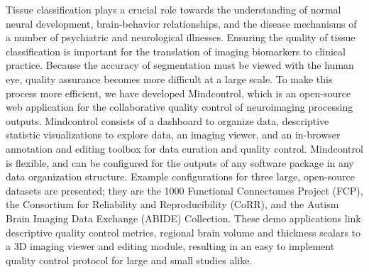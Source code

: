 Tissue classification plays a crucial role towards the understanding of normal neural development, brain-behavior relationships, and the disease mechanisms of a number of psychiatric and neurological illnesses. Ensuring the quality of tissue classification is important for the translation of imaging biomarkers to clinical practice. Because the accuracy of segmentation must be viewed with the human eye, quality assurance becomes more difficult at a large scale. To make this process more efficient, we have developed Mindcontrol, which is an open-source web application for the collaborative quality control of neuroimaging processing outputs. Mindcontrol consists of a dashboard to organize data, descriptive statistic visualizations to explore data, an imaging viewer, and an in-browser annotation and editing toolbox for data curation and quality control. Mindcontrol is flexible, and can be configured for the outputs of any software package in any data organization structure. Example configurations for three large, open-source datasets are presented; they are the 1000 Functional Connectomes Project (FCP), the Consortium for Reliability and Reproducibility (CoRR), and the Autism Brain Imaging Data Exchange (ABIDE) Collection. These demo applications link descriptive quality control metrics, regional brain volume and thickness scalars to a 3D imaging viewer and editing module, resulting in an easy to implement quality control protocol for large and small studies alike.